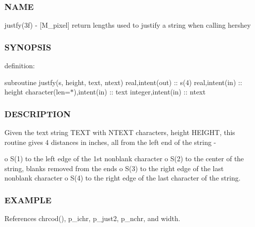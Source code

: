 \subsubsection*{N\+A\+ME}

justfy(3f) -\/ \mbox{[}M\+\_\+pixel\mbox{]} return lengths used to justify a string when calling hershey 

\subsubsection*{S\+Y\+N\+O\+P\+S\+IS}

definition\+:

subroutine justfy(s, height, text, ntext) real,intent(out) \+:\+: s(4) real,intent(in) \+:\+: height character(len=$\ast$),intent(in) \+:\+: text integer,intent(in) \+:\+: ntext

\subsubsection*{D\+E\+S\+C\+R\+I\+P\+T\+I\+ON}

Given the text string T\+E\+XT with N\+T\+E\+XT characters, height H\+E\+I\+G\+HT, this routine gives 4 distances in inches, all from the left end of the string -\/

o S(1) to the left edge of the 1st nonblank character o S(2) to the center of the string, blanks removed from the ends o S(3) to the right edge of the last nonblank character o S(4) to the right edge of the last character of the string.

\subsubsection*{E\+X\+A\+M\+P\+LE}

References chrcod(), p\+\_\+ichr, p\+\_\+just2, p\+\_\+nchr, and width.

\mbox{\label{namespacem__pixel_a491951b89e60d0d40d67f22d987da894}} 
